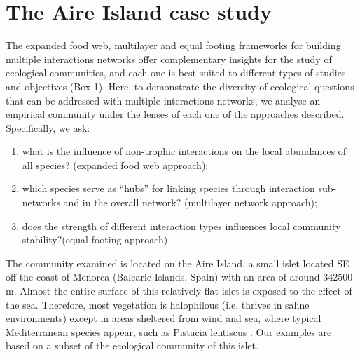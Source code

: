 \section*{The Aire Island case study}

The expanded food web, multilayer and equal footing frameworks for building multiple interactions networks offer complementary insights for the study of ecological communities, and each one is best suited to different types of studies and objectives (Box 1). Here, to demonstrate the diversity of ecological questions that can be addressed with multiple interactions networks, we analyse an empirical community under the lenses of each one of the approaches described. Specifically, we ask:

\begin{enumerate}
\item what is the influence of non-trophic interactions on the local abundances of all species? (expanded food web approach);
\item which species serve as ``hubs'' for linking species through interaction sub-networks and in the overall network? (multilayer network approach);
\item does the strength of different interaction types influences local community stability?(equal footing approach).
\end{enumerate}

The community examined is located on the Aire Island, a small islet located SE off the coast of Menorca (Balearic Islands, Spain) with an area of around 342500 m{\texttwosuperior}. Almost the entire surface of this relatively flat islet is exposed to the effect of the sea. Therefore, most vegetation is halophilous (i.e. thrives in saline environments) except in areas sheltered from wind and sea, where typical Mediterranean species appear, such as Pistacia lentiscus \citep{Perez-Mellado2006}. Our examples are based on a subset of the ecological community of this islet.


